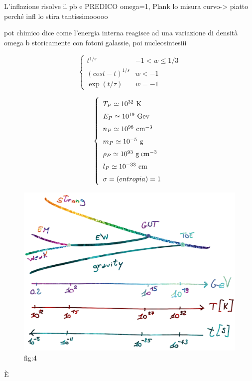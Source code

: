 L'inflazione risolve il pb e PREDICO omega=1, Plank lo misura
curvo-> piatto perché infl lo stira tantissimooooo

pot chimico dice come l'energia interna reagisce ad una variazione di densità
omega b storicamente con fotoni galassie, poi nucleosintesiii

\begin{equation}
    \left\{\begin{matrix}
        t^{1/s} & -1 < w \le 1/3\\ 
        (cost-t)^{1/s} & w<-1 \\
        \exp (t/\tau)&  w=-1
       \end{matrix}\right.
\end{equation}

\begin{equation}\left\{
    \def\arraystretch{1.5}
        \begin{array}{ll}
        T_P \simeq 10^{32}~\mathrm{K} \\
        E_P \simeq 10^{19}~\mathrm{Gev} \\
        n_P \simeq 10^{98}~\mathrm{cm}^{-3} \\
        m_P \simeq 10^{-5}~\mathrm{g} \\
        \rho_P \simeq 10^{93}~\mathrm{g\: cm}^{-3}  \\
        l_P \simeq 10^{-33}~\mathrm{cm} \\
        \sigma = (entropia) = 1 
    \end{array}\right. \label{eq:unitaplanckiane}
\end{equation}


\begin{figure}[H]
    \centering
    \includegraphics[width=.55 \textwidth]{Pictures/5/fasiprimordiali.png}
    \caption{fig:4}
\end{figure}


È